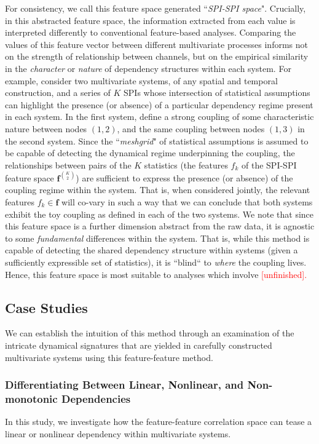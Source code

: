 For consistency, we call this feature space generated ``\textit{SPI-SPI space}". Crucially, in this abstracted feature space, the information extracted from each value is interpreted differently to conventional feature-based analyses. Comparing the values of this feature vector between different multivariate processes informs not on the strength of relationship between channels, but on the empirical similarity in the \textit{character} or \textit{nature} of dependency structures within each system. For example, consider two multivariate systems, of any spatial and temporal construction, and a series of $K$ SPIs whose intersection of statistical assumptions can highlight the presence (or absence) of a particular dependency regime present in each system. In the first system, define a strong coupling of some characteristic nature between nodes $(1, 2)$, and the same coupling between nodes $(1, 3)$ in the second system. Since the ``\textit{meshgrid}" of statistical assumptions is assumed to be capable of detecting the dynamical regime underpinning the coupling, the relationships between pairs of the $K$ statistics (the features $f_k$ of the SPI-SPI feature space $\mathbf{f}^{K \choose 2}$) are sufficient to express the presence (or absence) of the coupling regime within the system. That is, when considered jointly, the relevant features $f_k \in \mathbf{f}$ will co-vary in such a way that we can conclude that both systems exhibit the toy coupling as defined in each of the two systems. We note that since this feature space is a further dimension abstract from the raw data, it is agnostic to some \textit{fundamental} differences within the system. That is, while this method is capable of detecting the shared dependency structure within systems (given a sufficiently expressible set of statistics), it is ``blind`` to \textit{where} the coupling lives. Hence, this feature space is most suitable to analyses which involve \textcolor{red}{[unfinished].}


\subsection{Case Studies}
We can establish the intuition of this method through an examination of the intricate dynamical signatures that are yielded in carefully constructed multivariate systems using this feature-feature method.

\subsubsection{Differentiating Between Linear, Nonlinear, and Non-monotonic Dependencies}
In this study, we investigate how the feature-feature correlation space can tease a linear or nonlinear dependency within multivariate systems.

